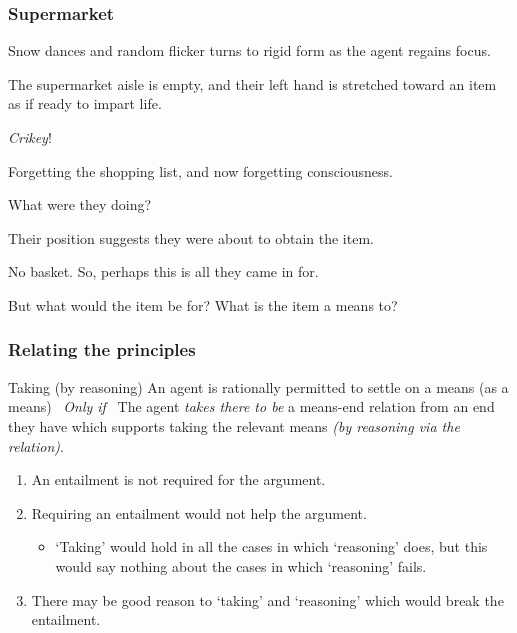 \documentclass[noamssymb, compress, handout]{beamer} %
\begin{document}
\begin{frame}
  \frametitle{Supermarket}

  {\rmfamily

    Snow dances and random flicker turns to rigid form as the agent regains focus.

    The supermarket aisle is empty, and their left hand is stretched toward an item as if ready to impart life.

    \emph{Crikey}!

    Forgetting the shopping list, and now forgetting consciousness.

    What were they doing?

    Their position suggests they were about to obtain the item.

    No basket. So, perhaps this is all they came in for.

    But what would the item be for?  What is the item a means to?

  }
\end{frame}


\begin{frame}
  \frametitle{Relating the principles}

  \begin{block}{Taking (by reasoning)}
    An agent is rationally permitted to settle on a means (as a means)
    \newline
    \mbox{ }\hfill\emph{Only if}\hfill\mbox{ }
    \newline
    The agent \emph{takes there to be}  a means-end relation from an end they have which supports taking the relevant means \emph{(by reasoning via the relation)}.
  \end{block}

  \begin{enumerate}
  \item An entailment is not required for the argument.
  \item Requiring an entailment would not help the argument.
    \begin{itemize}
    \item `Taking' would hold in all the cases in which `reasoning' does, but this would say nothing about the cases in which `reasoning' fails.
    \end{itemize}
  \item There may be good reason to `taking' and `reasoning' which would break the entailment.
  \end{enumerate}
\end{frame}
\end{document}
